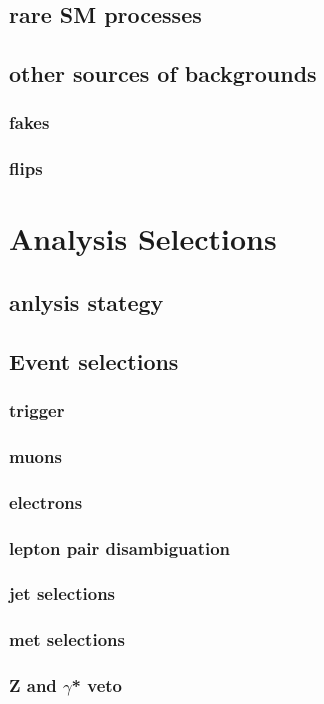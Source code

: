 \section{rare SM processes}
\section{other sources of backgrounds}
\subsection{fakes}
\subsection{flips}

\chapter{Analysis Selections}
\section{anlysis stategy}
\section{Event selections}
\subsection{trigger}
\subsection{muons}
\subsection{electrons}
\subsection{lepton pair disambiguation}
\subsection{jet selections}
\subsection{met selections}
\subsection{Z and $\gamma$* veto}
